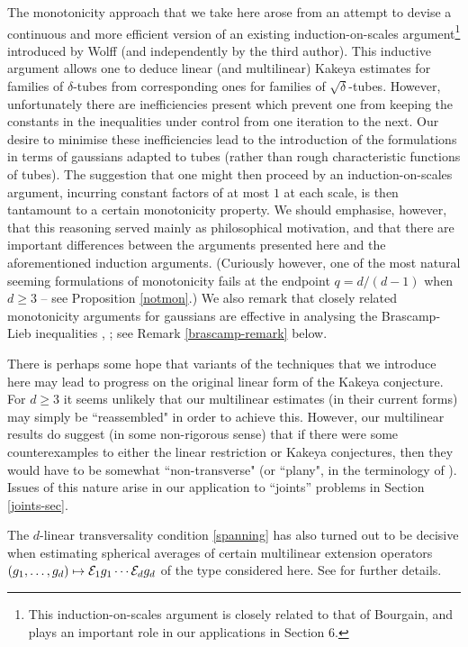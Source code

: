 \begin{remark}
The monotonicity approach that we take here arose from an attempt
to devise a continuous and more efficient version of an existing
induction-on-scales argument\footnote{This induction-on-scales
argument is closely related to that of Bourgain, and plays an
important role in our applications in Section 6.} introduced by
Wolff (and independently by the third author). This inductive
argument allows one to deduce linear (and multilinear) Kakeya
estimates for families of $\delta$-tubes from corresponding ones
for families of $\sqrt{\delta}$-tubes. However, unfortunately
there are inefficiencies present which prevent one from keeping
the constants in the inequalities under control from one iteration
to the next. Our desire to minimise these inefficiencies lead to
the introduction of the formulations in terms of gaussians adapted
to tubes (rather than rough characteristic functions of tubes).
The suggestion that one might then proceed by an
induction-on-scales argument, incurring constant factors of at
most $1$ at each scale, is then tantamount to a certain
monotonicity property. We should emphasise, however, that this
reasoning served mainly as philosophical motivation, and that
there are important differences between the arguments presented
here and the aforementioned induction arguments.
(Curiously however, one of
the most natural seeming formulations of monotonicity
fails at the endpoint $q=d/(d-1)$ when $d\geq 3$ -- see Proposition
\ref{notmon}.)  We also remark that closely related monotonicity arguments for
gaussians are effective in analysing
the Brascamp-Lieb inequalities \cite{CLL}, \cite{BCCT}; see
Remark \ref{brascamp-remark} below.
\end{remark}
\begin{remark}
There is perhaps some hope that variants of the techniques that we
introduce here may lead to progress on the original linear form of
the Kakeya conjecture. For $d\geq 3$ it seems unlikely that our
multilinear estimates (in their current forms) may simply be
``reassembled" in order to achieve this. However, our multilinear
results do suggest (in some non-rigorous sense) that if there were
some counterexamples to either the linear restriction or Kakeya
conjectures, then they would have to be somewhat ``non-transverse"
(or ``plany", in the terminology of \cite{KLT}). Issues of this nature
arise in our application to ``joints'' problems in Section \ref{joints-sec}.
\end{remark}
\begin{remark}
The $d$-linear transversality condition \eqref{spanning} has
also turned out
to be decisive when estimating
spherical averages
of certain multilinear extension operators
$(g_1,\hdots,g_d)\mapsto{\mathcal{E}}_1 g_1\cdots{\mathcal{E}}_d g_d$ of the type considered
here. See \cite{BBC} for further details.
\end{remark}
